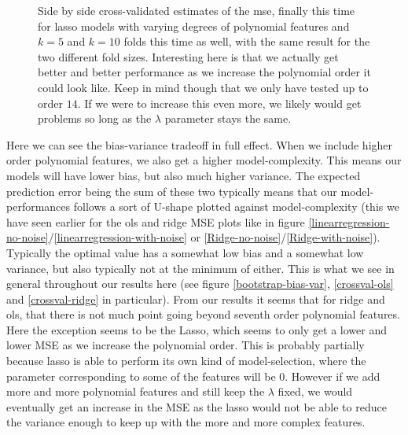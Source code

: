 \documentclass{article}
\begin{document}
\begin{figure}
    \centering
    \quad
    \caption{Side by side cross-validated estimates of the mse, finally this time for lasso models with varying degrees of polynomial features and $k=5$ and
        $k=10$ folds this time as well, with the same result for the two
        different fold sizes. Interesting here is that we actually get better
        and better performance as we increase the polynomial order it could look
        like. Keep in mind though that we only have tested up to order $14$. If
        we were to increase this even more, we likely would get problems so long
        as the $\lambda$ parameter stays the same.}
    \label{crossval-lasso}
\end{figure}

Here we can see the bias-variance tradeoff in full effect. When we include
higher order polynomial features, we also get a higher model-complexity. This
means our models will have lower bias, but also much higher variance. The
expected prediction error being the sum of these two typically means that our
model-performances follows a sort of U-shape plotted against model-complexity
(this we have seen earlier for the ols and ridge MSE plots like in figure
\ref{linearregression-no-noise}/\ref{linearregression-with-noise} or
\ref{Ridge-no-noise}/\ref{Ridge-with-noise}).  Typically the optimal value has a
somewhat low bias and a somewhat low variance, but also typically not at the
minimum of either. This is what we see in general throughout our results here
(see figure \ref{bootstrap-bias-var}, \ref{crossval-ols} and \ref{crossval-ridge} in particular).
From our results it seems that for ridge and ols, that there is not much point
going beyond  seventh order polynomial features. Here the exception seems to be the
Lasso, which seems to only get a lower and lower MSE as we increase the
polynomial order.  This is probably partially because lasso is able to perform
its own kind of model-selection, where the parameter corresponding to some of
the features will be $0$. However if we add more and more polynomial features
and still keep the $\lambda$ fixed, we would eventually get an increase in the
MSE as the lasso would not be able to reduce the variance enough to keep up with
the more and more complex features.
\end{document}
